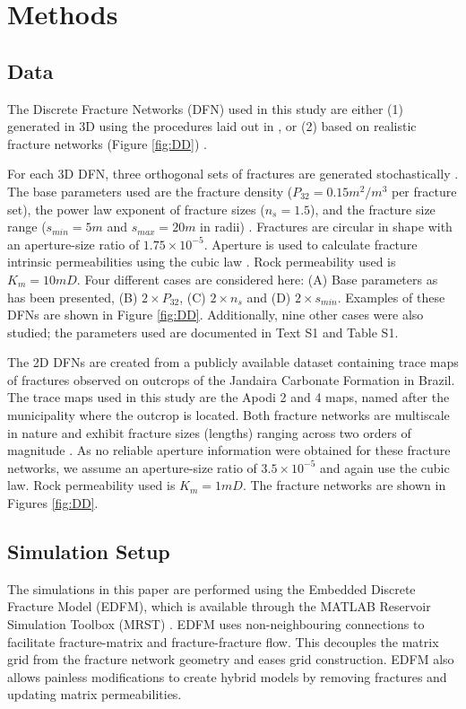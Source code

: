\documentclass[draft]{agujournal2018}
\begin{document}
\section{Methods}

\subsection{Data}
The Discrete Fracture Networks (DFN) used in this study are either (1) generated in 3D using the procedures laid out in \citet{Priest1993}, or (2) based on realistic fracture networks (Figure \ref{fig:DD}) \citep{Bisdom2017}.

For each 3D DFN, three orthogonal sets of fractures are generated stochastically \citep{Priest1993}. The base parameters used are the fracture density ($P_{32}=0.15m^2/m^3$ per fracture set), the power law exponent of fracture sizes ($n_s=1.5$), and the fracture size range ($s_{min}=5m$ and $s_{max}=20m$ in radii) \citep{Bonnet2001, Dershowitz1992}. Fractures are circular in shape with an aperture-size ratio of $1.75\times 10^{-5}$. Aperture is used to calculate fracture intrinsic permeabilities using the cubic law \citep{Witherspoon1980}. Rock permeability used is $K_m=10mD$. Four different cases are considered here: (A) Base parameters as has been presented, (B) $2\times P_{32}$, (C) $2\times n_s$ and (D) $2\times s_{min}$. Examples of these DFNs are shown in Figure \ref{fig:DD}. Additionally, nine other cases were also studied; the parameters used are documented in Text S1 and Table S1.

The 2D DFNs are created from a publicly available dataset containing trace maps of fractures observed on outcrops of the Jandaira Carbonate Formation in Brazil. The trace maps used in this study are the Apodi 2 and 4 maps, named after the municipality where the outcrop is located. Both fracture networks are multiscale in nature and exhibit fracture sizes (lengths) ranging across two orders of magnitude \citep{Bisdom2017}. As no reliable aperture information were obtained for these fracture networks, we assume an aperture-size ratio of $3.5\times 10^{-5}$ and again use the cubic law. Rock permeability used is $K_m=1mD$. The fracture networks are shown in Figures \ref{fig:DD}.


\subsection{Simulation Setup}
The simulations in this paper are performed using the Embedded Discrete Fracture Model (EDFM), which is available through the MATLAB Reservoir Simulation Toolbox (MRST) \citep{Lee2001, Lie2015, Moinfar2013}. EDFM uses non-neighbouring connections to facilitate fracture-matrix and fracture-fracture flow. This decouples the matrix grid from the fracture network geometry and eases grid construction. EDFM also allows painless modifications to create hybrid models by removing fractures and updating matrix permeabilities.
\end{document}
